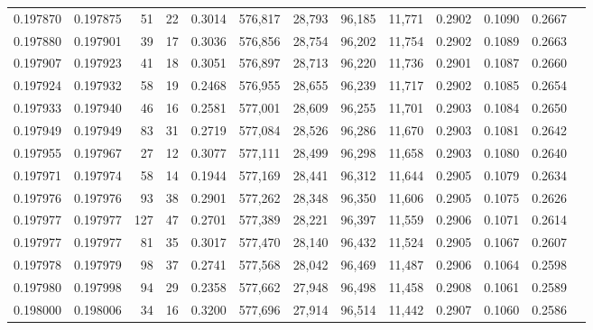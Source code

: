 \begin{tabular}{rrrrrrrrrrrrr}
0.197870 & 0.197875 &    51 &  22 &                                     0.3014 & 576,817 &  28,793 &  96,185 &  11,771 & 0.2902 & 0.1090 & 0.2667 \\
0.197880 & 0.197901 &    39 &  17 &                                     0.3036 & 576,856 &  28,754 &  96,202 &  11,754 & 0.2902 & 0.1089 & 0.2663 \\
0.197907 & 0.197923 &    41 &  18 &                                     0.3051 & 576,897 &  28,713 &  96,220 &  11,736 & 0.2901 & 0.1087 & 0.2660 \\
0.197924 & 0.197932 &    58 &  19 &                                     0.2468 & 576,955 &  28,655 &  96,239 &  11,717 & 0.2902 & 0.1085 & 0.2654 \\
0.197933 & 0.197940 &    46 &  16 &                                     0.2581 & 577,001 &  28,609 &  96,255 &  11,701 & 0.2903 & 0.1084 & 0.2650 \\
0.197949 & 0.197949 &    83 &  31 &                                     0.2719 & 577,084 &  28,526 &  96,286 &  11,670 & 0.2903 & 0.1081 & 0.2642 \\
0.197955 & 0.197967 &    27 &  12 &                                     0.3077 & 577,111 &  28,499 &  96,298 &  11,658 & 0.2903 & 0.1080 & 0.2640 \\
0.197971 & 0.197974 &    58 &  14 &                                     0.1944 & 577,169 &  28,441 &  96,312 &  11,644 & 0.2905 & 0.1079 & 0.2634 \\
0.197976 & 0.197976 &    93 &  38 &                                     0.2901 & 577,262 &  28,348 &  96,350 &  11,606 & 0.2905 & 0.1075 & 0.2626 \\
0.197977 & 0.197977 &   127 &  47 &                                     0.2701 & 577,389 &  28,221 &  96,397 &  11,559 & 0.2906 & 0.1071 & 0.2614 \\
0.197977 & 0.197977 &    81 &  35 &                                     0.3017 & 577,470 &  28,140 &  96,432 &  11,524 & 0.2905 & 0.1067 & 0.2607 \\
0.197978 & 0.197979 &    98 &  37 &                                     0.2741 & 577,568 &  28,042 &  96,469 &  11,487 & 0.2906 & 0.1064 & 0.2598 \\
0.197980 & 0.197998 &    94 &  29 &                                     0.2358 & 577,662 &  27,948 &  96,498 &  11,458 & 0.2908 & 0.1061 & 0.2589 \\
0.198000 & 0.198006 &    34 &  16 &                                     0.3200 & 577,696 &  27,914 &  96,514 &  11,442 & 0.2907 & 0.1060 & 0.2586 \\

\end{tabular}

